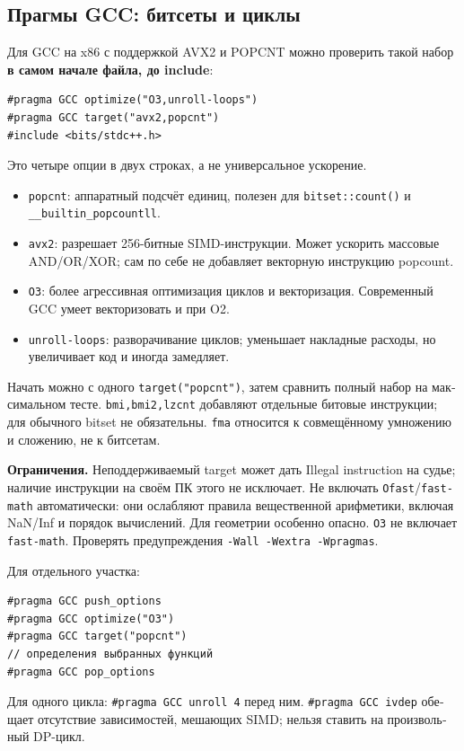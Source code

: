 \subsection{Прагмы GCC: битсеты и циклы}
\begingroup
\footnotesize
\let\latintexttt\texttt
\renewcommand{\texttt}[1]{{\fontencoding{T1}\selectfont\latintexttt{#1}}}
\begin{otherlanguage}{russian}
Для GCC на x86 с поддержкой AVX2 и POPCNT можно проверить
такой набор \textbf{в самом начале файла, до include}:
\begin{lstlisting}
#pragma GCC optimize("O3,unroll-loops")
#pragma GCC target("avx2,popcnt")
#include <bits/stdc++.h>
\end{lstlisting}
Это четыре опции в двух строках, а не универсальное ускорение.
\begin{itemize}[nosep,leftmargin=*]
\item \texttt{popcnt}: аппаратный подсчёт единиц, полезен для
\texttt{bitset::count()} и \texttt{\_\_builtin\_popcountll}.
\item \texttt{avx2}: разрешает 256-битные SIMD-инструкции.
Может ускорить массовые AND/OR/XOR; сам по себе не добавляет
векторную инструкцию popcount.
\item \texttt{O3}: более агрессивная оптимизация циклов и
векторизация. Современный GCC умеет векторизовать и при O2.
\item \texttt{unroll-loops}: разворачивание циклов; уменьшает
накладные расходы, но увеличивает код и иногда замедляет.
\end{itemize}
Начать можно с одного \texttt{target("popcnt")}, затем сравнить
полный набор на максимальном тесте.
\texttt{bmi,bmi2,lzcnt} добавляют отдельные битовые инструкции;
для обычного bitset не обязательны.
\texttt{fma} относится к совмещённому умножению и сложению, не к битсетам.

\textbf{Ограничения.}
Неподдерживаемый target может дать Illegal instruction на судье;
наличие инструкции на своём ПК этого не исключает.
Не включать \texttt{Ofast}/\texttt{fast-math} автоматически:
они ослабляют правила вещественной арифметики, включая
NaN/Inf и порядок вычислений. Для геометрии особенно опасно.
\texttt{O3} не включает \texttt{fast-math}.
Проверять предупреждения \texttt{-Wall -Wextra -Wpragmas}.

Для отдельного участка:
\begin{lstlisting}
#pragma GCC push_options
#pragma GCC optimize("O3")
#pragma GCC target("popcnt")
// определения выбранных функций
#pragma GCC pop_options
\end{lstlisting}
Для одного цикла: \texttt{\#pragma GCC unroll 4} перед ним.
\texttt{\#pragma GCC ivdep} обещает отсутствие зависимостей,
мешающих SIMD; нельзя ставить на произвольный DP-цикл.


\end{otherlanguage}
